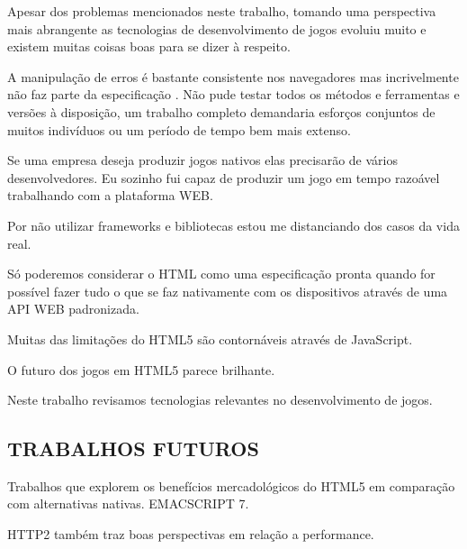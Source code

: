 
Apesar dos problemas mencionados neste trabalho, tomando uma perspectiva mais
abrangente as tecnologias de desenvolvimento de jogos evoluiu muito e existem muitas coisas boas para se dizer à respeito.

A manipulação de erros é bastante consistente nos navegadores mas 
incrivelmente não faz parte da especificação \autocite{howBrowsersWork}.
Não pude testar todos os métodos e ferramentas e versões à
disposição, um trabalho completo demandaria esforços conjuntos de
muitos indivíduos ou um período de tempo bem mais extenso. 

Se uma empresa deseja produzir jogos nativos elas precisarão de vários
desenvolvedores. Eu sozinho fui capaz de produzir um jogo em tempo
razoável trabalhando com a plataforma WEB.

Por não utilizar frameworks e bibliotecas estou me distanciando
dos casos da vida real.

Só poderemos considerar o HTML como uma especificação pronta quando
for possível fazer tudo o que se faz nativamente com os dispositivos
através de uma API WEB padronizada.

Muitas das limitações do HTML5 são contornáveis através de JavaScript.

O futuro dos jogos em HTML5 parece brilhante.

Neste trabalho revisamos tecnologias relevantes no desenvolvimento de
jogos.

\subsection{TRABALHOS FUTUROS}

Trabalhos que explorem os benefícios mercadológicos do HTML5 em comparação com alternativas nativas.
EMACSCRIPT 7.

HTTP2 também traz boas perspectivas em relação a performance.

